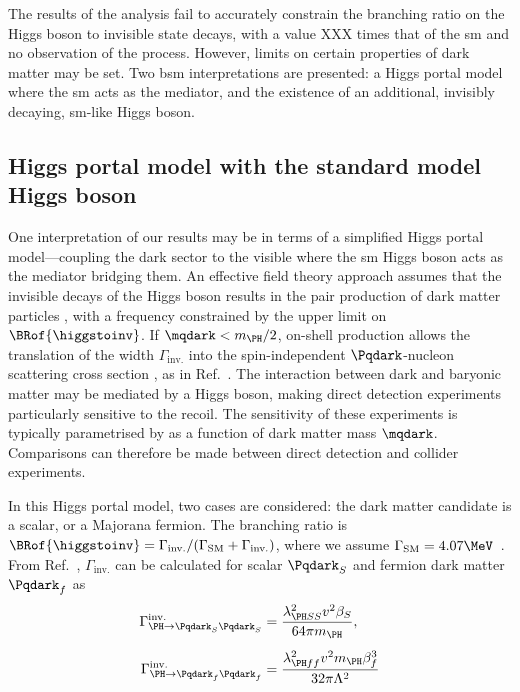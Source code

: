 The results of the analysis fail to accurately constrain the branching ratio on the Higgs boson to invisible state decays, with a value XXX times that of the \acrlong{sm} and no observation of the process. However, limits on certain properties of dark matter may be set. Two \acrshort{bsm} interpretations are presented: a Higgs portal model where the \acrshort{sm} acts as the mediator, and the existence of an additional, invisibly decaying, \acrshort{sm}-like Higgs boson.




\subsection{Higgs portal model with the standard model Higgs boson}
\label{subsec:htoinv_dark_matter_higgs_portal}

One interpretation of our results may be in terms of a simplified Higgs portal model---coupling the dark sector to the visible where the \acrshort{sm} Higgs boson acts as the mediator bridging them. An effective field theory approach assumes that the invisible decays of the Higgs boson results in the pair production of dark matter particles \Pqdark, with a frequency constrained by the upper limit on $\BRof{\higgstoinv}$. If $\mqdark < m_{\PH}/\text{2}$, on-shell production allows the translation of the \higgstoinv width $\Gamma_{\mathrm{inv.}}$ into the spin-independent $\Pqdark$-nucleon scattering cross section \xsecSI, as in Ref.~. The interaction between dark and baryonic matter may be mediated by a Higgs boson, making direct detection experiments particularly sensitive to the recoil. The sensitivity of these experiments is typically parametrised by \xsecSI as a function of dark matter mass $\mqdark$. Comparisons can therefore be made between direct detection and collider experiments.

In this Higgs portal model, two cases are considered: the dark matter candidate is a scalar, or a Majorana fermion. The branching ratio is $\BRof{\higgstoinv} = \Gamma_{\mathrm{inv.}}/(\Gamma_{\mathrm{SM}} + \Gamma_{\mathrm{inv.}})$, where we assume $\Gamma_{\mathrm{SM}} = \text{4.07}\MeV$~\cite{Heinemeyer:1559921}. From Ref.~, $\Gamma_{\mathrm{inv.}}$ can be calculated for scalar $\Pqdark_{S}$ and fermion dark matter $\Pqdark_{f}$ as
\begin{equation}
    \begin{aligned}
\Gamma^{\mathrm{inv.}}_{\PH \rightarrow \Pqdark_{S}\Pqdark_{S}} &= \frac{ \lambda^2_{\PH SS} v^2 \beta_S }{64\pi m_{\PH}},\\[0.5em]
\Gamma^{\mathrm{inv.}}_{\PH \rightarrow \Pqdark_{f}\Pqdark_{f}} &= \frac{ \lambda^2_{\PH ff} v^2 m_{\PH} \beta_f^3 }{ 32\pi \Lambda^2 }
    \end{aligned}
\end{equation}

